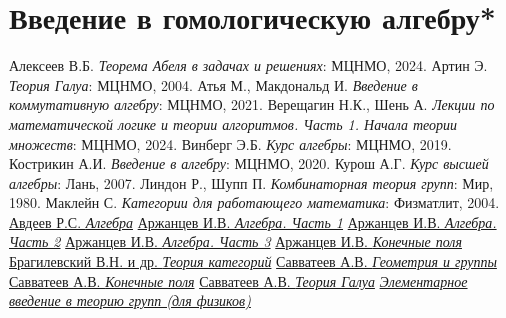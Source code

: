 \documentclass[a4paper, 14pt]{extarticle}
\theoremstyle{definition}
\theoremstyle{plain}
\numberwithin{theorem}{section}
\numberwithin{definition}{section}
\numberwithin{statement}{section}
\numberwithin{lemma}{section}
\numberwithin{consequence}{section}
\begin{document}
    \section{Введение в гомологическую алгебру*}
    \setcounter{definition}{0}
	\newpage
	\begin{thebibliography}{99}
         Алексеев В.Б. \textit{Теорема Абеля в задачах и решениях}: МЦНМО, 2024.
         Артин Э. \textit{Теория Галуа}: МЦНМО, 2004.
         Атья М., Макдональд И. \textit{Введение в коммутативную алгебру}: МЦНМО, 2021.
		 Верещагин Н.К., Шень А.
		\textit{Лекции по математической логике и теории алгоритмов. Часть 1. Начала теории множеств}: МЦНМО, 2024.
         Винберг Э.Б. \textit{Курс алгебры}: МЦНМО, 2019.
		 Кострикин А.И. \textit{Введение в алгебру}: МЦНМО, 2020.
		 Курош А.Г. \textit{Курс высшей алгебры}: Лань, 2007.
		 Линдон Р., Шупп П. \textit{Комбинаторная теория групп}: Мир, 1980.
		 Маклейн С. \textit{Категории для работающего математика}: Физматлит, 2004.
         \href{https://youtube.com/playlist?list=PLEwK9wdS5g0pxQ2ThGS3ObFwm4h1Ll0Kr&si=AM33kfEJxKFqNR-k}{Авдеев Р.С. \textit{Алгебра}}
         \href{https://youtube.com/playlist?list=PLcsjsqLLSfNDNW9aTp8CVwvbKpTwACTjg&si=7FPCwsvufoDRX0ma}{Аржанцев И.В. \textit{Алгебра. Часть 1}}
         \href{https://youtube.com/playlist?list=PLcsjsqLLSfNBes4Xj0eZJRYU2j-Vmpyc9&si=4ev672dK9VFnEIw-}{Аржанцев И.В. \textit{Алгебра. Часть 2}}
         \href{https://youtube.com/playlist?list=PLp9ABVh6_x4H52YxrWoJn0sS3XSoK9_Il&si=cPkPI_sHb8OTqWaH}{Аржанцев И.В. \textit{Алгебра. Часть 3}}
		 \href{https://www.youtube.com/watch?v=9PTiaQODKiA}{Аржанцев И.В. \textit{Конечные поля}}
         \href{https://youtube.com/playlist?list=PLvPsfYrGz3wsX3Z5KuuEVYhijDxhKCDDD&si=eh_MI9GO0mYzxZMU}{Брагилевский В.Н. и др. \textit{Теория категорий}}
         \href{https://youtube.com/playlist?list=PLlx2izuC9gjgZsBALx2ZF7IMGoNl07A9l&si=9X5Oosl5a53UTlTb}{Савватеев А.В. \textit{Геометрия и группы}}
		 \href{https://youtube.com/playlist?list=PLH3NNipqeM1vcHnP4czWemq5DyBw9MXxn&si=UFBR6POWzySgFqPt}{Савватеев А.В. \textit{Конечные поля}}
		 \href{https://youtube.com/playlist?list=PLgEpoT7yAl9VWebUfw4uOlut1ZaoFjFcb&si=yM6DjTk5Cenofg5U}{Савватеев А.В. \textit{Теория Галуа}}
		 \href{https://youtube.com/playlist?list=PLnbH8YQPwKblIpRi0ARO2VadnMwntvF51&si=qXQx9-xB7_arfxB8}{\textit{Элементарное введение в теорию групп (для физиков)}}
	\end{thebibliography}
\end{document}

